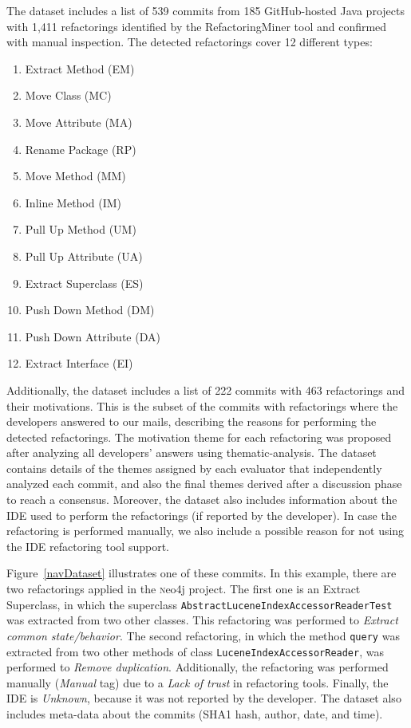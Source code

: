 The dataset includes a list of 539 commits from 185 GitHub-hosted Java projects with 1,411 refactorings identified by the RefactoringMiner tool and confirmed with manual inspection. The detected refactorings cover 12 different types:
\begin{enumerate}
	\item Extract Method (EM)
	\item Move Class (MC)
	\item Move Attribute (MA)
	\item Rename Package (RP)
	\item Move Method (MM)
	\item Inline Method (IM)
	\item Pull Up Method (UM)
	\item Pull Up Attribute (UA)
	\item Extract Superclass (ES)
	\item Push Down Method (DM)
	\item Push Down Attribute (DA)
	\item Extract Interface (EI)
\end{enumerate}


Additionally, the dataset includes a list of 222 commits with 463 refactorings and their motivations.
This is the subset of the commits with refactorings where the developers answered to our mails, describing the reasons for performing the detected refactorings. The motivation theme for each refactoring was proposed after analyzing all developers' answers using thematic-analysis. The dataset contains details of the themes assigned by each evaluator that independently analyzed each commit, and also the final themes derived after a discussion phase to reach a consensus.
Moreover, the dataset also includes information about the IDE used to perform the refactorings (if reported by the developer). In case the refactoring is performed manually, we also include a possible reason for not using the IDE refactoring tool support.


Figure~\ref{navDataset} illustrates one of these commits. 
In this example, there are two refactorings applied in the {\textsc neo4j} project. The first one is an {\textsc Extract Superclass}, in which the superclass \texttt{AbstractLuceneIndexAccessorReaderTest} was extracted from two other classes. This refactoring was performed to \emph{Extract common state/behavior}. The second refactoring, in which the method \texttt{query} was extracted from two other methods of class \texttt{LuceneIndexAccessorReader}, was performed to \emph{Remove duplication}. Additionally, the refactoring was performed manually (\emph{Manual} tag) due to a \emph{Lack of trust} in refactoring tools. Finally, the IDE is \emph{Unknown}, because it was not reported by the developer.
The dataset also includes meta-data about the commits (SHA1 hash, author, date, and time).


